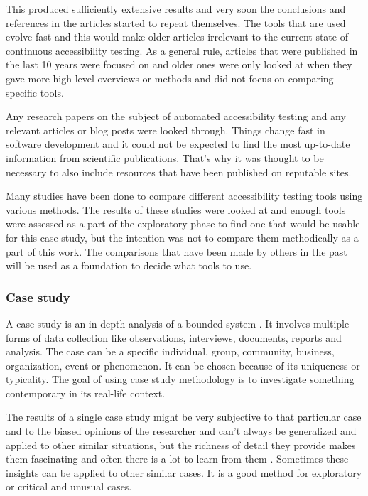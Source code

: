 \documentclass{master_thesis}
\begin{document}
This produced sufficiently extensive results and very soon the conclusions and references in the articles started to repeat themselves. The tools that are used evolve fast and this would make older articles irrelevant to the current state of continuous accessibility testing. As a general rule, articles that were published in the last 10 years were focused on and older ones were only looked at when they gave more high-level overviews or methods and did not focus on comparing specific tools.

Any research papers on the subject of automated accessibility testing and any relevant articles or blog posts were looked through. Things change fast in software development and it could not be expected to find the most up-to-date information from scientific publications. That's why it was thought to be necessary to also include resources that have been published on reputable sites.

Many studies \citep{Alsaeedi2020, Ismailova2022, Sane2021, Vigo2013, RybinKoob2022, Duran2017} have been done to compare different accessibility testing tools using various methods. The results of these studies were looked at and enough tools were assessed as a part of the exploratory phase to find one that would be usable for this case study, but the intention was not to compare them methodically as a part of this work. The comparisons that have been made by others in the past will be used as a foundation to decide what tools to use.

\subsubsection{Case study}

A case study is an in-depth analysis of a bounded system \citep{Range2023}. It involves multiple forms of data collection like observations, interviews, documents, reports and analysis. The case can be a specific individual, group, community, business, organization, event or phenomenon. It can be chosen because of its uniqueness or typicality. The goal of using case study methodology is to investigate something contemporary in its real-life context.

The results of a single case study might be very subjective to that particular case and to the biased opinions of the researcher and can't always be generalized and applied to other similar situations, but the richness of detail they provide makes them fascinating and often there is a lot to learn from them \citep{Range2023}. Sometimes these insights can be applied to other similar cases. It is a good method for exploratory or critical and unusual cases.
\end{document}
